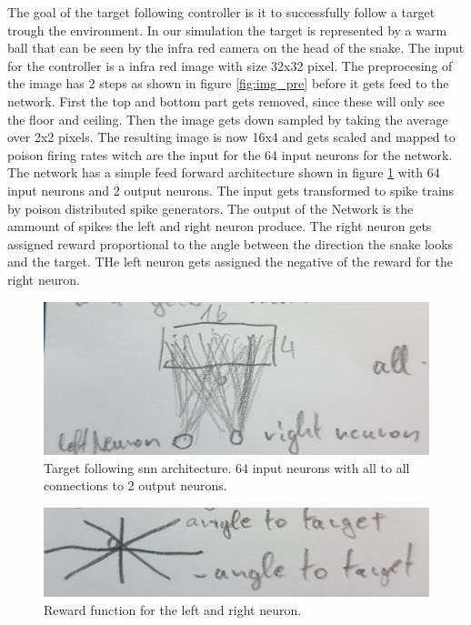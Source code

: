 The goal of the target following controller is it to successfully follow a target trough the environment. In our simulation the target is represented by a warm ball that can be seen by the infra red camera on the head of the snake. The input for the controller is a infra red image with size 32x32 pixel. The preprocesing of the image has 2 steps as shown in figure \ref{fig:img_pre} before it gets feed to the network. First the top and bottom part gets removed, since these will only see the floor and ceiling. Then the image gets down sampled by taking the average over 2x2 pixels. The resulting image is now 16x4 and gets scaled and mapped to poison firing rates witch are the input for the 64 input neurons for the network. The network has a  simple feed forward architecture shown in figure \ref{fig:follw_arch} with 64 input neurons and 2 output neurons. The input gets transformed to spike trains by poison distributed spike generators. The output of the Network is the ammount of spikes the left and right neuron produce. The right neuron gets assigned reward proportional to the angle between the direction the snake looks and the target. THe left neuron gets assigned the negative of the reward for the right neuron.

\begin{figure}
	\includegraphics[width=\linewidth]{images/follow_arch.jpg}
	\caption{Target following snn architecture. 64 input neurons with all to all connections to 2 output neurons.}
	\label{fig:follw_arch}
\end{figure}

\begin{figure}
	\includegraphics[width=\linewidth]{images/follow_rew.jpg}
	\caption{Reward function for the left and right neuron.}
	\label{fig:follw_rew}
\end{figure}


